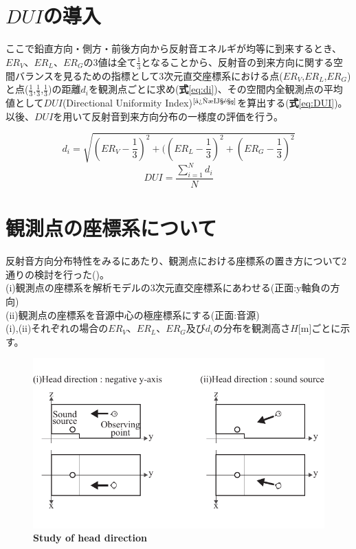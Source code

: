 \section{$DUI$の導入}
ここで鉛直方向・側方・前後方向から反射音エネルギが均等に到来するとき、$ER_V$、$ER_L$、$ER_G$の3値は全て$\frac{1}{3}$となることから、反射音の到来方向に関する空間バランスを見るための指標として3次元直交座標系における点($ER_V$,$ER_L$,$ER_G$)と点($\frac{1}{3}$,$\frac{1}{3}$,$\frac{1}{3}$)の距離$d_i$を観測点ごとに求め(\textbf{式}\ref{eq:di})、その空間内全観測点の平均値として$DUI$(Directional Uniformity Index)$^{\text{\cite{後期音}}}$を算出する(\textbf{式}\ref{eq:DUI})。以後、$DUI$を用いて反射音到来方向分布の一様度の評価を行う。
\begin{table}[htbp]
\begin{equation}
  \label{eq:di}
  d_i = \sqrt{\left({ER_V-\frac{1}{3}}\right)^2 + (\left(ER_L-\frac{1}{3}\right)^2 + \left(ER_G-\frac{1}{3}\right)^2} 
\end{equation}
\begin{equation}
    \label{eq:DUI}
    DUI=\frac{\sum_{i=1}^N{d_i}}{N}
\end{equation}
\end{table}

\section{観測点の座標系について}
反射音方向分布特性をみるにあたり、観測点における座標系の置き方について2通りの検討を行った()。\\
(i)観測点の座標系を解析モデルの3次元直交座標系にあわせる(正面:y軸負の方向)\\
(ii)観測点の座標系を音源中心の極座標系にする(正面:音源)\\
(i),(ii)それぞれの場合の$ER_V$、$ER_L$、$ER_G$及び$d_i$の分布を観測高さ$H$[m]ごとに示す。

\begin{figure}[htbp]
    \centering
    \includegraphics[keepaspectratio,scale=1]{05_att/observing.pdf}
    \caption{\hspace{1mm}\textbf{Study of head direction}}
    \label{fig:observing}
\end{figure}

